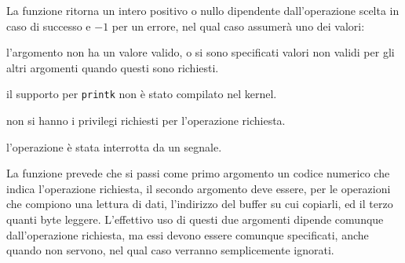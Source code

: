 \begin{funcproto}{
}

{La funzione ritorna un intero positivo o nullo dipendente dall'operazione
  scelta in caso di successo e $-1$ per un errore, nel qual caso 
  assumerà uno dei valori:
  \begin{errlist}
  \item[\errcode{EINVAL}] l'argomento  non ha un valore valido, o si
    sono specificati valori non validi per gli altri argomenti quando questi
    sono richiesti.
  \item[\errcode{ENOSYS}] il supporto per \texttt{printk} non è stato compilato
    nel kernel.
  \item[\errcode{EPERM}] non si hanno i privilegi richiesti per l'operazione
    richiesta.
  \item[\errcode{ERESTARTSYS}] l'operazione è stata interrotta da un segnale.
   \end{errlist}
}
\end{funcproto}

La funzione prevede che si passi come primo argomento  un codice
numerico che indica l'operazione richiesta, il secondo argomento deve essere,
per le operazioni che compiono una lettura di dati, l'indirizzo del buffer su
cui copiarli, ed il terzo quanti byte leggere. L'effettivo uso di questi due
argomenti dipende comunque dall'operazione richiesta, ma essi devono essere
comunque specificati, anche quando non servono, nel qual caso verranno
semplicemente ignorati.

